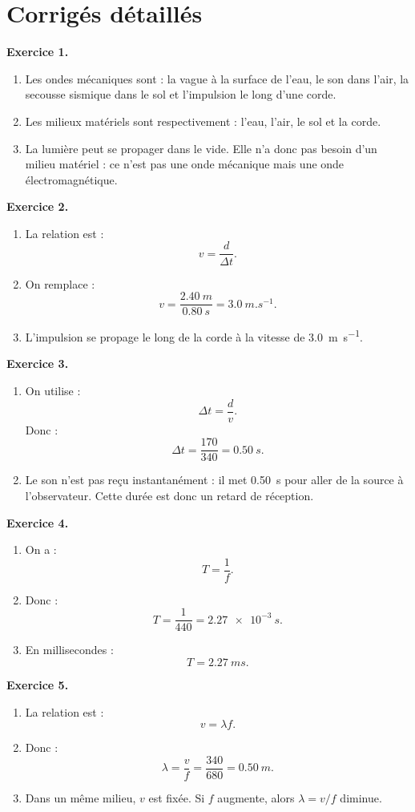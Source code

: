 \documentclass[11pt,a4paper]{article}
\newcommand{\corr}[2]{
  \begin{correctionbox}
  \textbf{Exercice #1.} #2
  \end{correctionbox}
}
\begin{document}
\newpage

\section{Corrigés détaillés}

\corr{1}{
\begin{enumerate}
  \item Les ondes mécaniques sont : la vague à la surface de l'eau, le son dans l'air, la secousse sismique dans le sol et l'impulsion le long d'une corde.
  \item Les milieux matériels sont respectivement : l'eau, l'air, le sol et la corde.
  \item La lumière peut se propager dans le vide. Elle n'a donc pas besoin d'un milieu matériel : ce n'est pas une onde mécanique mais une onde électromagnétique.
\end{enumerate}
}

\corr{2}{
\begin{enumerate}
  \item La relation est :
  \[
  v=\frac{d}{\Delta t}.
  \]
  \item On remplace :
  \[
  v=\frac{\SI{2.40}{m}}{\SI{0.80}{s}}=\SI{3.0}{m.s^{-1}}.
  \]
  \item L'impulsion se propage le long de la corde à la vitesse de \SI{3.0}{m.s^{-1}}.
\end{enumerate}
}

\corr{3}{
\begin{enumerate}
  \item On utilise :
  \[
  \Delta t=\frac{d}{v}.
  \]
  Donc :
  \[
  \Delta t=\frac{170}{340}=\SI{0.50}{s}.
  \]
  \item Le son n'est pas reçu instantanément : il met \SI{0.50}{s} pour aller de la source à l'observateur. Cette durée est donc un retard de réception.
\end{enumerate}
}

\corr{4}{
\begin{enumerate}
  \item On a :
  \[
  T=\frac{1}{f}.
  \]
  \item Donc :
  \[
  T=\frac{1}{440}=\SI{2.27e-3}{s}.
  \]
  \item En millisecondes :
  \[
  T=\SI{2.27}{ms}.
  \]
\end{enumerate}
}

\corr{5}{
\begin{enumerate}
  \item La relation est :
  \[
  v=\lambda f.
  \]
  \item Donc :
  \[
  \lambda=\frac{v}{f}=\frac{340}{680}=\SI{0.50}{m}.
  \]
  \item Dans un même milieu, $v$ est fixée. Si $f$ augmente, alors $\lambda=v/f$ diminue.
\end{enumerate}
}
\end{document}
